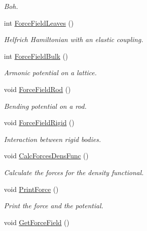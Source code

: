 \begin{DoxyCompactItemize}
\begin{DoxyCompactList}\small\item\em Boh. \end{DoxyCompactList}\item 
int \hyperlink{classForces_aed97e42cbfeb918574e91a90719864ab}{Force\+Field\+Leaves} ()
\begin{DoxyCompactList}\small\item\em Helfrich Hamiltonian with an elastic coupling. \end{DoxyCompactList}\item 
int \hyperlink{classForces_aa57796d41906bf35c6a79225ecda6f98}{Force\+Field\+Bulk} ()
\begin{DoxyCompactList}\small\item\em Armonic potential on a lattice. \end{DoxyCompactList}\item 
void \hyperlink{classForces_ae35380222f8a3cacfa4a4df6d1742ffb}{Force\+Field\+Rod} ()
\begin{DoxyCompactList}\small\item\em Bending potential on a rod. \end{DoxyCompactList}\item 
void \hyperlink{classForces_a8f12492ed75d05c816d8f14bbeaf71be}{Force\+Field\+Rigid} ()\hypertarget{classForces_a8f12492ed75d05c816d8f14bbeaf71be}{}\label{classForces_a8f12492ed75d05c816d8f14bbeaf71be}

\begin{DoxyCompactList}\small\item\em Interaction between rigid bodies. \end{DoxyCompactList}\item 
void \hyperlink{classForces_a5c32ef207ba714e72e72de3063860b39}{Calc\+Forces\+Dens\+Func} ()\hypertarget{classForces_a5c32ef207ba714e72e72de3063860b39}{}\label{classForces_a5c32ef207ba714e72e72de3063860b39}

\begin{DoxyCompactList}\small\item\em Calculate the forces for the density functional. \end{DoxyCompactList}\item 
void \hyperlink{classForces_a7b92a25206538d578d6129879bfac183}{Print\+Force} ()\hypertarget{classForces_a7b92a25206538d578d6129879bfac183}{}\label{classForces_a7b92a25206538d578d6129879bfac183}

\begin{DoxyCompactList}\small\item\em Print the force and the potential. \end{DoxyCompactList}\item 
void \hyperlink{classForces_a68e26f1fe45d8de3362c59de39ddcbc9}{Get\+Force\+Field} ()\hypertarget{classForces_a68e26f1fe45d8de3362c59de39ddcbc9}{}\label{classForces_a68e26f1fe45d8de3362c59de39ddcbc9}


\end{DoxyCompactItemize}
